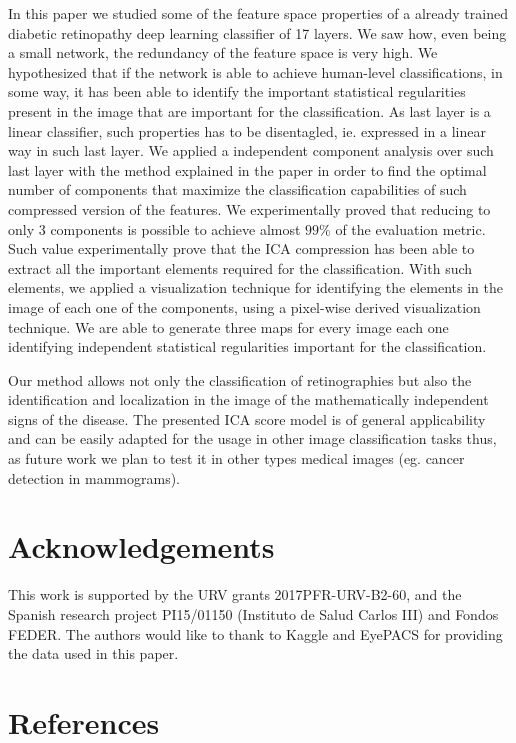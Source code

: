 \documentclass[preprint]{elsarticle}
\theoremstyle{definition} %
\theoremstyle{remark}
\begin{document}
In this paper we studied some of the feature space properties of a already trained diabetic retinopathy deep learning classifier of 17 layers. We saw how, even being a small network, the redundancy of the feature space is very high. We hypothesized that if the network is able to achieve human-level classifications, in some way, it has been able to identify the important statistical regularities present in the image that are important for the classification. As last layer is a linear classifier, such properties has to be disentagled, ie. expressed in a linear way in such last layer. We applied a independent component analysis over such last layer with the method explained in the paper in order to find the optimal number of components that maximize the classification capabilities of such compressed version of the features. We experimentally proved that reducing to only 3 components is possible to achieve almost $99\%$ of the evaluation metric. Such value experimentally prove that the ICA compression has been able to extract all the important elements required for the classification. With such elements, we applied a visualization technique for identifying the elements in the image of each one of the components, using a pixel-wise derived visualization technique. We are able to generate three maps for every image each one identifying independent statistical regularities important for the classification.

Our method allows not only the classification of retinographies but also the identification and localization in the image of the mathematically independent signs of the disease. The presented ICA score model is of general applicability and can be easily adapted for the usage in other image classification tasks thus, as future work we plan to test it in other types medical images (eg. cancer detection in mammograms).

\section*{Acknowledgements}

This work is supported by the URV grants 2017PFR-URV-B2-60, and the Spanish research project PI15/01150 (Instituto de Salud Carlos III) and Fondos FEDER. The authors would like to thank to Kaggle and EyePACS for providing the data used in this paper.

\section*{References}
% 
%

\end{document}
